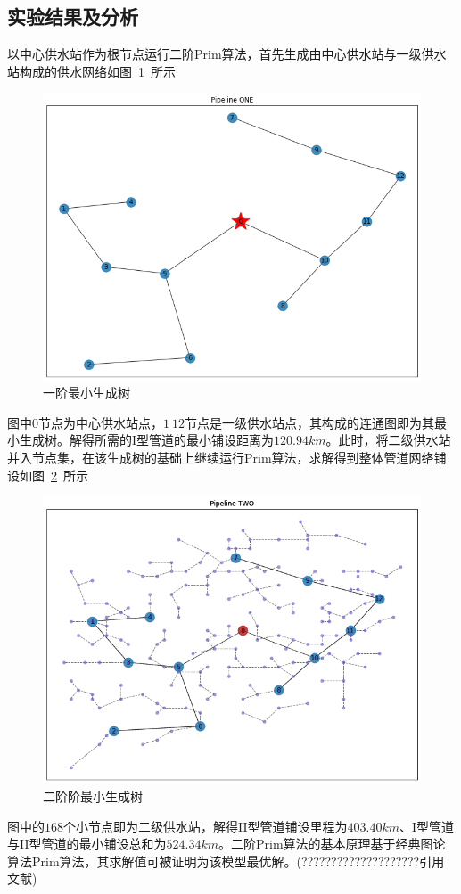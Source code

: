 \documentclass{whutmod}
\begin{document}
        \subsection{实验结果及分析}
       以中心供水站作为根节点运行二阶Prim算法，首先生成由中心供水站与一级供水站构成的供水网络如图~\ref{sdfb}~所示
       	\begin{figure}[H]
       	\centering
       	\includegraphics[width=\textwidth]{figures/444.png}
       	\caption{一阶最小生成树}\label{sdfb}
       \end{figure}
       图中$0$节点为中心供水站点，$1~12$节点是一级供水站点，其构成的连通图即为其最小生成树。解得所需的I型管道的最小铺设距离为$120.94km$。此时，将二级供水站并入节点集，在该生成树的基础上继续运行Prim算法，求解得到整体管道网络铺设如图~\ref{gfhd}~所示
       	\begin{figure}[H]
       	\centering
       	\includegraphics[width=\textwidth]{figures/222.png}
       	\caption{二阶阶最小生成树}\label{gfhd}
       \end{figure}
     图中的$168$个小节点即为二级供水站，解得II型管道铺设里程为$403.40km$、I型管道与II型管道的最小铺设总和为$524.34km$。二阶Prim算法的基本原理基于经典图论算法Prim算法，其求解值可被证明为该模型最优解。(????????????????????引用文献)
\end{document}
